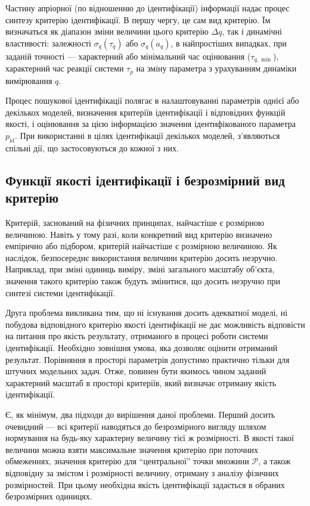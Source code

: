Частину апріорної (по відношенню до ідентифікації) інформації
надає процес синтезу критерію ідентифікації. В першу чергу, це сам вид
критерію. Їм визначаться як діапазон зміни величини цього критерію
$\Delta q$, так і динамічні властивості: залежності
$\sigma_q (\tau_q)$ або $\sigma_q(a_q)$,
в найпростіших випадках, при заданій точності --- характерний або
мінімальний час оцінювання ($\tau_{q, \min}$),
характерний час реакції
системи $\tau_p$ на зміну параметра з урахуванням динаміки вимірювання $q$.

Процес пошукової ідентифікації полягає в налаштовуванні параметрів однієї або
декількох моделей, визначення критеріїв ідентифікації і відповідних функцій
якості, і оцінювання за цією інформацією значення ідентифікованого параметра
\label{atu:d:p_id}$p_\mathrm{id}$. При використанні в цілях
ідентифікації декількох моделей, з'являються спільні дії, що застосовуються до
кожної з них.




\subsection{Функції якості ідентифікації і безрозмірний вид критерію} %


Критерій, заснований на фізичних принципах, найчастіше є розмірною величиною.
Навіть у тому разі, коли конкретний вид критерію визначено емпірично або
підбором, критерій найчастіше є розмірною величиною.
Як наслідок, безпосереднє
використання величини критерію досить незручно. Наприклад, при зміні одиниць
виміру, зміні загального масштабу об'єкта, значення такого критерію також
будуть змінитися, що досить незручно при синтезі системи ідентифікації.

Друга проблема викликана тим, що ні існування досить
адекватної моделі, ні побудова відповідного критерію якості
ідентифікації не дає можливість відповісти на питання
про якість результату, отриманого в процесі роботи системи
ідентифікації. Необхідно зовнішня умова, яка дозволяє оцінити
отриманий результат. Порівняння в просторі параметрів допустимо
практично тільки для штучних модельних задач. Отже, повинен
бути якимось чином заданий характерний масштаб в просторі
критеріїв, який визначає отриману якість ідентифікації.

Є, як мінімум, два підходи до вирішення даної проблеми. Перший
досить очевидний --- всі критерії наводяться до безрозмірного
вигляду шляхом нормування на будь-яку характерну величину тієї ж
розмірності. В якості такої величини можна взяти максимальне
значення критерію при поточних обмеженнях, значення критерію
для ``центральної'' точки множини $\mathcal{P}$,
а також відповідну за змістом і розмірності величину,
отриману з аналізу фізичних розмірностей. При цьому необхідна
якість ідентифікації задається в обраних безрозмірних одиницях.

